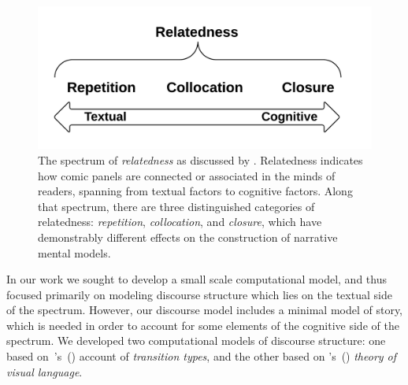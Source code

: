 %
\begin{figure}
	\includegraphics[width=\columnwidth]{relatedness.png}
	\caption{
		The spectrum of \emph{relatedness} as discussed by
		. Relatedness indicates how 
		comic panels are connected or associated in the minds of 
		readers, spanning from textual factors to cognitive factors. 
		Along that spectrum, there are three  distinguished 
		categories of relatedness: \emph{repetition}, 
		\emph{collocation}, and \emph{closure}, which have
		demonstrably different effects on the construction of
		narrative mental models.
		}
	\label{figure:relatedness}
\end{figure}
%
%

%
In our work we sought to develop a small scale computational model, and thus
focused primarily on modeling discourse structure which lies on the textual
side of the spectrum. However, our discourse model includes a minimal model of
story, which is needed in order to account for some elements of the cognitive
side of the spectrum.  We developed two computational models of discourse
structure: one based
on~\citeauthor{mcCloud1993understanding}'s~(\citeyear{mcCloud1993understanding})
account of \emph{transition types}, and the other based on
\citeauthor{cohn2013visual}'s~(\citeyear{cohn2013visual}) \emph{theory of visual
language}.



